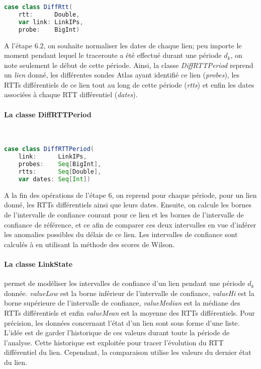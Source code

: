 \begin{lstlisting}[language=scala, caption={La classe DiffRtt en Scala }]
case class DiffRtt(
	rtt:      Double,
	var link: LinkIPs,
	probe:    BigInt)
\end{lstlisting}

A l'étape $6.2$, on souhaite normaliser les dates de chaque lien; peu importe le moment pendant lequel le traceroute a été effectué durant une période $d_k$, on note seulement le début de cette période. Ainsi,  la classe  \textit{DiffRTTPeriod}  reprend un \textit{lien} donné, les différentes sondes Atlas ayant identifié ce lien (\textit{probes}), les RTTs différentiels de ce lien tout au long de cette période (\textit{rtts}) et enfin les dates associées à chaque RTT différentiel (\textit{dates}).
\paragraph{La classe DiffRTTPeriod } ~
\begin{lstlisting}[language=scala, caption={La classe DiffRTTPeriod en Scala }]
case class DiffRTTPeriod(
	link:      LinkIPs,
	probes:    Seq[BigInt],
	rtts:      Seq[Double],
	var dates: Seq[Int])
\end{lstlisting}

A la fin des opérations de l'étape $6$, on reprend pour chaque période, pour un lien donné, les RTTs différentiels ainsi que leurs dates. Ensuite, on calcule les bornes de l'intervalle de confiance courant pour ce lien et les bornes de l'intervalle de confiance de référence, et ce afin de comparer ces deux intervalles en vue d'inférer les anomalies possibles du délais de ce lien. Les intervalles de confiance sont calculés à en utilisant  la méthode des scores de Wilson.


\paragraph{La classe LinkState } permet de modéliser les intervalles de confiance d'un lien pendant une période $d_k$ donnée. \textit{valueLow} est la borne inférieur de l'intervalle de confiance, \textit{valueHi} est la borne supérieure de l'intervalle de confiance, \textit{valueMedian} est la médiane des RTTs différentiels et enfin \textit{valueMean} est la moyenne des RTTs différentiels. Pour précision, les données concernant l'état d'un lien sont sous forme d'une liste. L'idée est de garder l'historique de ces valeurs durant toute la période de l'analyse. Cette historique est exploitée pour tracer l'évolution du RTT différentiel du lien. Cependant, la comparaison utilise les valeurs du dernier état du lien.

